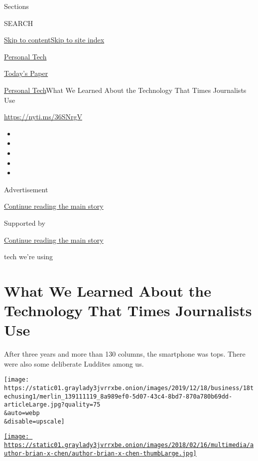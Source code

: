 Sections

SEARCH

\protect\hyperlink{site-content}{Skip to
content}\protect\hyperlink{site-index}{Skip to site index}

\href{https://www.nytimes3xbfgragh.onion/section/technology/personaltech}{Personal
Tech}

\href{https://myaccount.nytimes3xbfgragh.onion/auth/login?response_type=cookie\&client_id=vi}{}

\href{https://www.nytimes3xbfgragh.onion/section/todayspaper}{Today's
Paper}

\href{/section/technology/personaltech}{Personal Tech}\textbar{}What We
Learned About the Technology That Times Journalists Use

\href{https://nyti.ms/36SNrgV}{https://nyti.ms/36SNrgV}

\begin{itemize}
\item
\item
\item
\item
\item
\end{itemize}

Advertisement

\protect\hyperlink{after-top}{Continue reading the main story}

Supported by

\protect\hyperlink{after-sponsor}{Continue reading the main story}

tech we're using

\hypertarget{what-we-learned-about-the-technology-that-times-journalists-use}{%
\section{What We Learned About the Technology That Times Journalists
Use}\label{what-we-learned-about-the-technology-that-times-journalists-use}}

After three years and more than 130 columns, the smartphone was tops.
There were also some deliberate Luddites among us.

\texttt{[image: https://static01.graylady3jvrrxbe.onion/images/2019/12/18/business/18techusing1/merlin\_139111119\_8a989ef0-5d07-43c4-8bd7-870a780b69dd-articleLarge.jpg?quality=75\\\&auto=webp\\\&disable=upscale]}

\href{https://www.nytimes3xbfgragh.onion/by/brian-x-chen}{\texttt{[image: https://static01.graylady3jvrrxbe.onion/images/2018/02/16/multimedia/author-brian-x-chen/author-brian-x-chen-thumbLarge.jpg]}}

